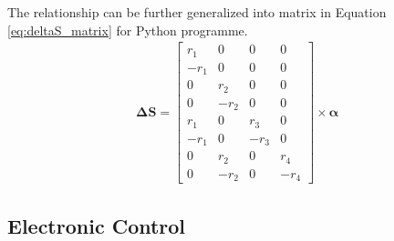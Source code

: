 The relationship can be further generalized into matrix in Equation \ref{eq:deltaS_matrix} for Python programme.
\begin{align}
    \boldsymbol{\Delta S} = 
    \begin{bmatrix}
        r_1&0&0&0\\
        -r_1&0&0&0\\
        0&r_2&0&0\\
        0&-r_2&0&0\\
        r_1&0&r_3&0\\
        -r_1&0&-r_3&0\\
        0&r_2&0&r_4\\
        0&-r_2&0&-r_4
    \end{bmatrix}
    \times
    \boldsymbol{\alpha}
    \label{eq:deltaS_matrix}
\end{align}
\subsection{Electronic Control}
